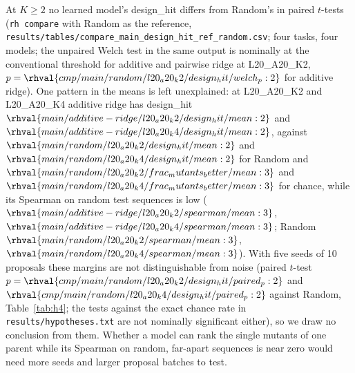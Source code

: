 At $K\ge2$ no learned model's design\_hit differs from Random's in paired $t$-tests (\texttt{rh compare} with Random as the reference, \texttt{results/tables/compare\_main\_design\_hit\_ref\_random.csv}; four tasks, four models; the unpaired Welch test in the same output is nominally at the conventional threshold for additive and pairwise ridge at L20\_A20\_K2, $p=\rhval{cmp/main/random/l20_a20_k2/design_hit/welch_p:2}$ for additive ridge). One pattern in the means is left unexplained: at L20\_A20\_K2 and L20\_A20\_K4 additive ridge has design\_hit $\rhval{main/additive-ridge/l20_a20_k2/design_hit/mean:2}$ and $\rhval{main/additive-ridge/l20_a20_k4/design_hit/mean:2}$, against $\rhval{main/random/l20_a20_k2/design_hit/mean:2}$ and $\rhval{main/random/l20_a20_k4/design_hit/mean:2}$ for Random and $\rhval{main/random/l20_a20_k2/frac_mutants_better/mean:3}$ and $\rhval{main/random/l20_a20_k4/frac_mutants_better/mean:3}$ for chance, while its Spearman on random test sequences is low ($\rhval{main/additive-ridge/l20_a20_k2/spearman/mean:3}$, $\rhval{main/additive-ridge/l20_a20_k4/spearman/mean:3}$; Random $\rhval{main/random/l20_a20_k2/spearman/mean:3}$, $\rhval{main/random/l20_a20_k4/spearman/mean:3}$). With five seeds of 10 proposals these margins are not distinguishable from noise (paired $t$-test $p=\rhval{cmp/main/random/l20_a20_k2/design_hit/paired_p:2}$ and $\rhval{cmp/main/random/l20_a20_k4/design_hit/paired_p:2}$ against Random, Table~\ref{tab:h4}; the tests against the exact chance rate in \texttt{results/hypotheses.txt} are not nominally significant either), so we draw no conclusion from them. Whether a model can rank the single mutants of one parent while its Spearman on random, far-apart sequences is near zero would need more seeds and larger proposal batches to test.

